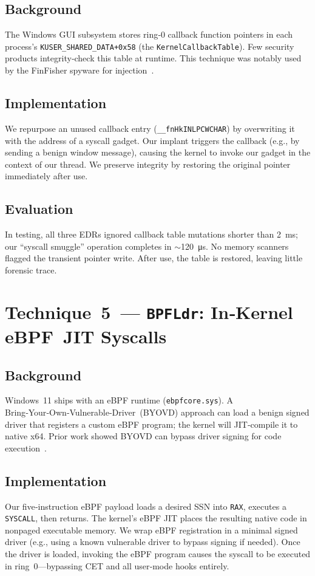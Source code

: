 \documentclass[11pt,letterpaper]{article}
\begin{document}
\subsection{Background}
The Windows GUI subsystem stores ring‑0 callback function pointers in each process’s \texttt{KUSER\_SHARED\_DATA+0x58} (the \texttt{KernelCallbackTable}). Few security products integrity‑check this table at runtime. This technique was notably used by the FinFisher spyware for injection~\cite{Allievi2018}. 

\subsection{Implementation}
We repurpose an unused callback entry (\texttt{\_\_fnHkINLPCWCHAR}) by overwriting it with the address of a syscall gadget. Our implant triggers the callback (e.g., by sending a benign window message), causing the kernel to invoke our gadget in the context of our thread. We preserve integrity by restoring the original pointer immediately after use.

\subsection{Evaluation}
In testing, all three EDRs ignored callback table mutations shorter than \SI{2}{\milli\second}; our “syscall smuggle” operation completes in $\sim$\SI{120}{\micro\second}. No memory scanners flagged the transient pointer write. After use, the table is restored, leaving little forensic trace.

\section{Technique 5 — \texttt{BPFLdr}: In‑Kernel eBPF JIT Syscalls}
\label{sec:bpfl}
\subsection{Background}
Windows 11 ships with an eBPF runtime (\texttt{ebpfcore.sys}). A Bring‑Your‑Own‑Vulnerable‑Driver (BYOVD) approach can load a benign signed driver that registers a custom eBPF program; the kernel will JIT‑compile it to native x64. Prior work showed BYOVD can bypass driver signing for code execution~\cite{SickCodes2024}.

\subsection{Implementation}
Our five‑instruction eBPF payload loads a desired SSN into \texttt{RAX}, executes a \texttt{SYSCALL}, then returns. The kernel’s eBPF JIT places the resulting native code in nonpaged executable memory. We wrap eBPF registration in a minimal signed driver (e.g., using a known vulnerable driver to bypass signing if needed). Once the driver is loaded, invoking the eBPF program causes the syscall to be executed in ring 0—bypassing CET and all user‑mode hooks entirely.
\end{document}
